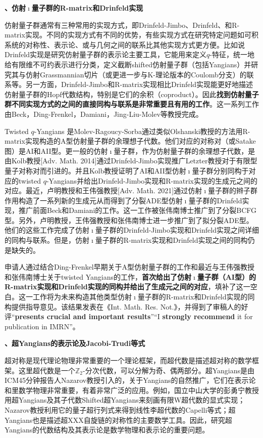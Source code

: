 \documentclass[12pt,UTF8,AutoFakeBold=4,a4paper]{ctexart}
\begin{document}
\medskip

\textbf{、仿射$\imath$量子群的R-matrix和Drinfeld实现}

仿射量子群通常有三种常用的实现方式，即Drinfeld-Jimbo、Drinfeld、和R-matrix实现。不同的实现方式有不同的优势，有些实现方式在研究特定问题如可积系统的对称性、表示论、或与几何之间的联系比其他实现方式更方便。比如说Drinfeld实现是研究仿射量子群的表示论主要工具，它能用来定义$q$-特征，统一地给有限维不可约表示进行分类，定义截断shifted仿射量子群（包括Yangians）并研究其与仿射Grassmannian切片（或更进一步与K-理论版本的Coulomb分支）的联系等。另一方面，Drinfeld-Jimbo和R-matrix实现相比Drinfeld实现能更好地描述仿射量子群的Hopf代数结构，特别是它们的余积（coproduct）。因此\textbf{找到仿射量子群不同实现方式的之间的直接同构与联系是非常重要且有用的工作}。这一系列工作由Beck，Ding-Frenkel，Damiani，Jing-Liu-Molev等教授完成。

Twisted $q$-Yangians 是Molev-Ragoucy-Sorba通过类似Olshanski教授的方法用R-matrix实现构造的A型仿射量子群的余理想子代数。他们对应的对称对（或Satake图）是AI和AII型。更一般的仿射$\imath$量子群，作为仿射量子群的余理想子代数，是由Kolb教授[Adv. Math. 2014]通过Drinfeld-Jimbo实现推广Letzter教授对于有限型量子对称对而引进的。并且Kolb教授证明了AI和AII型仿射$\imath$量子群分别同构于对应的twisted $q$-Yangians并给出Drinfeld-Jimbo实现和R-matrix实现的生成元之间的对应。最近，卢明教授和王伟强教授[Adv. Math. 2021]通过仿射$\imath$量子群的辫子群作用构造了一系列新的生成元从而得到了分裂ADE型仿射$\imath$量子群的Drinfeld实现，推广前面Beck和Damiani的工作。这一工作被张伟南博士推广到了分裂BCFG型。另外，卢明教授，王伟强教授和张伟南博士进一步推广到了拟分裂ADE型。他们的这些工作完成了仿射$\imath$量子群的Drinfeld-Jimbo实现和Drinfeld实现之间详细的同构与联系。但是，仿射$\imath$量子群的R-matrix实现和Drinfeld实现之间的同构仍是缺失的。

申请人通过结合Ding-Frenkel早期关于A型仿射量子群的工作和最近与王伟强教授和张伟南博士关于twisted Yangians的工作，\textbf{首次给出了仿射$\imath$量子群（AI型）的R-matrix实现和Drinfeld实现的同构并给出了生成元之间的对应}，填补了这一空白。这一工作将为未来构造其他类型仿射$\imath$量子群的R-matrix和Drinfeld实现的同构提供指导意见。该结果发表在《Int. Math. Res. Not.》，并得到了审稿人的好评“\textbf{presents crucial and important results}”“I \textbf{strongly recommend} it for publication in IMRN”。

\medskip

\textbf{、超Yangians的表示论及Jacobi-Trudi等式}

超对称是现代理论物理非常重要的一个理论框架，而超代数是描述超对称的数学框架。这里超代数是一个$\mathbb Z_2$-分次代数，可以分解为奇、偶两部分。超Yangians是由ICM45分钟报告人Nazarov教授引入的，关于Yangians的自然推广，它们在表示论和里数学物理非常重要，有着非常广泛的应用。例如，国立中山大学的彭勇宁教授用超Yangians及其子代数Shifted超Yangians来刻画有限W超代数的显式实现；Nazarov教授利用它的量子超行列式来得到线性李超代数的Capelli等式；超Yangians也是描述超XXX自旋链的对称性的主要数学工具。因此，研究超Yangians的代数结构及其表示论是数学物理和表示论的重要问题。
\end{document}
